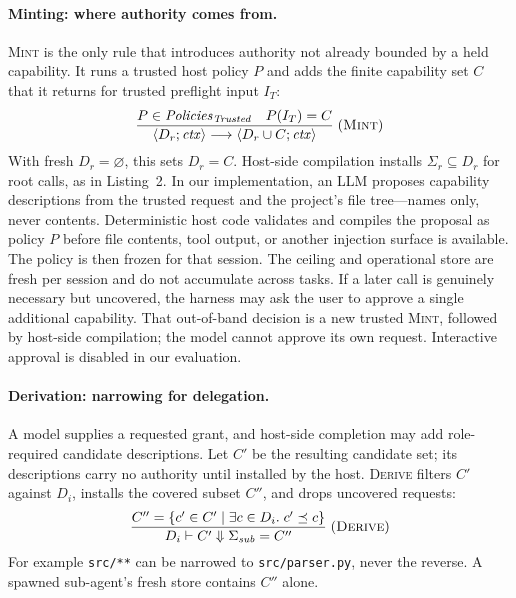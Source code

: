 \documentclass[sigplan,review,anonymous]{acmart}
\newcommand{\Trusted}{\mathit{Trusted}}
\newcommand{\rulename}[1]{\textsc{#1}}
\begin{document}
  \paragraph{Minting: where authority comes from.}
  \rulename{Mint} is the only rule that introduces authority not already
  bounded by a held capability. It runs a trusted host policy $P$ and adds the
  finite capability set $C$ that it returns for trusted preflight input $I_T$:
  {\small\[
    \frac{
      P \in \mathit{Policies}_{\Trusted} \quad P(I_T)=C
    }{
      \langle D_r;\mathit{ctx}\rangle \longrightarrow
      \langle D_r\cup C;\mathit{ctx}\rangle
    }\; (\rulename{Mint})
  \]}
  With fresh $D_r=\varnothing$, this sets $D_r=C$. Host-side compilation installs
  $\Sigma_r\subseteq D_r$ for root calls, as in Listing~2.
  In our implementation, an LLM proposes capability descriptions from the
  trusted request and the project's file tree---names only, never contents.
  Deterministic host code validates and compiles the proposal as policy $P$
  before file contents, tool output, or another injection surface is available. The
  policy is then frozen for that session. The ceiling and operational store are
  fresh per session and do not accumulate across tasks. If a later call is genuinely necessary
  but uncovered, the harness may ask the user to approve a single additional
  capability. That out-of-band decision is a new trusted \rulename{Mint},
  followed by host-side compilation; the model cannot approve its own request.
  Interactive approval is disabled in our evaluation.

  \paragraph{Derivation: narrowing for delegation.}
  A model supplies a requested grant, and host-side completion may add
  role-required candidate descriptions. Let $C'$ be the resulting candidate
  set; its descriptions carry no authority until installed by the host.
  \rulename{Derive} filters $C'$ against $D_i$, installs the covered subset
  $C''$, and drops uncovered requests:
  {\small\[
    \frac{
      C''=\{c'\in C' \mid \exists c\in D_i.\;c'\preceq c\}
    }{
      D_i \vdash C' \Downarrow \Sigma_{\mathit{sub}}=C''
    }\; (\rulename{Derive})
  \]}
  For example \texttt{src/**} can be narrowed to \texttt{src/parser.py}, never
  the reverse. A spawned sub-agent's fresh store contains $C''$ alone.
\end{document}
